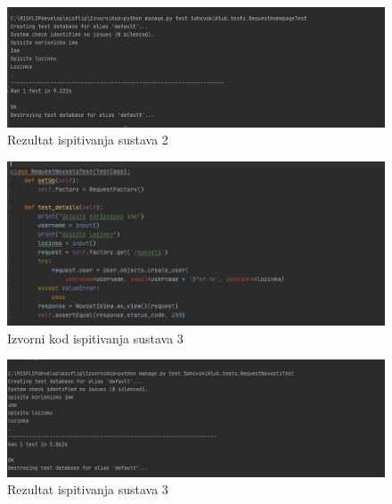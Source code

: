 			 \begin{figure}[H]
			 	\centerfloat
			 	\includegraphics[scale=0.55]{slike/ispitivanjesustava1.jpeg} %
			 	\caption{Rezultat ispitivanja sustava 2}
			 	
			 \end{figure}
			 
			 \begin{figure}[H]
			 	\centerfloat
			 	\includegraphics[scale=0.55]{slike/ispitivanjesustava3izv.jpeg} %
			 	\caption{Izvorni kod ispitivanja sustava 3}
			 	
			 \end{figure}
			 
			 \begin{figure}[H]
			 	\centerfloat
			 	\includegraphics[scale=0.55]{slike/ispitivanjesustava3.jpeg} %
			 	\caption{Rezultat ispitivanja sustava 3}
			 	
			 \end{figure}
			 
